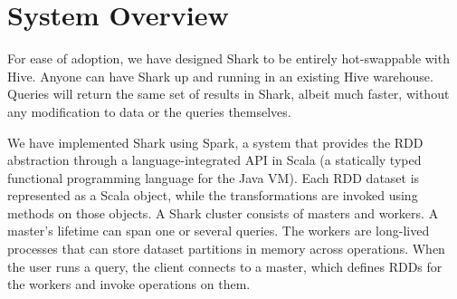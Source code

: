 \documentclass[preprint]{acm_proc_article-sp}
\begin{document}



\section{System Overview}

For ease of adoption, we have designed Shark to be entirely hot-swappable with Hive. Anyone can have Shark up and running in an existing Hive warehouse. Queries will return the same set of results in Shark, albeit much faster, without any modification to data or the queries themselves.

We have implemented Shark using Spark, a system that provides the RDD abstraction through a language-integrated API in Scala (a statically typed functional programming language for the Java VM). Each RDD dataset is represented as a Scala object, while the transformations are invoked using methods on those objects. A Shark cluster consists of masters and workers. A master's lifetime can span one or several queries. The workers are long-lived processes that can store dataset partitions in memory across operations. When the user runs a query, the client connects to a master, which defines RDDs for the workers and invoke operations on them.
\end{document}
